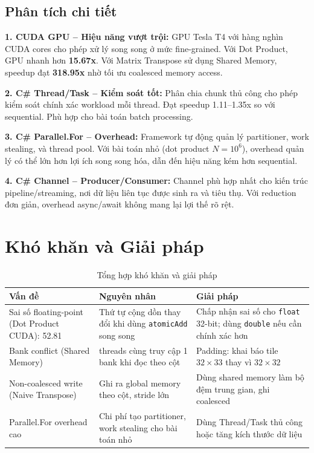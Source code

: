 \documentclass[12pt,a4paper]{article}
\begin{document}
\subsection{Phân tích chi tiết}

\textbf{1. CUDA GPU -- Hiệu năng vượt trội:}
GPU Tesla T4 với hàng nghìn CUDA cores cho phép xử lý song song ở mức fine-grained. Với Dot Product, GPU nhanh hơn \textbf{15.67x}. Với Matrix Transpose sử dụng Shared Memory, speedup đạt \textbf{318.95x} nhờ tối ưu coalesced memory access.

\textbf{2. C\# Thread/Task -- Kiểm soát tốt:}
Phân chia chunk thủ công cho phép kiểm soát chính xác workload mỗi thread. Đạt speedup 1.11--1.35x so với sequential. Phù hợp cho bài toán batch processing.

\textbf{3. C\# Parallel.For -- Overhead:}
Framework tự động quản lý partitioner, work stealing, và thread pool. Với bài toán nhỏ (dot product $N=10^6$), overhead quản lý có thể lớn hơn lợi ích song song hóa, dẫn đến hiệu năng kém hơn sequential.

\textbf{4. C\# Channel -- Producer/Consumer:}
Channel phù hợp nhất cho kiến trúc pipeline/streaming, nơi dữ liệu liên tục được sinh ra và tiêu thụ. Với reduction đơn giản, overhead async/await không mang lại lợi thế rõ rệt.

\section{Khó khăn và Giải pháp}

\begin{table}[H]
\centering
\caption{Tổng hợp khó khăn và giải pháp}
\begin{tabular}{>{\raggedright\arraybackslash}p{4.5cm}>{\raggedright\arraybackslash}p{4.5cm}>{\raggedright\arraybackslash}p{4.5cm}}
\toprule
\textbf{Vấn đề} & \textbf{Nguyên nhân} & \textbf{Giải pháp} \\
\midrule
Sai số floating-point (Dot Product CUDA): 52.81 &
Thứ tự cộng dồn thay đổi khi dùng \texttt{atomicAdd} song song &
Chấp nhận sai số cho \texttt{float} 32-bit; dùng \texttt{double} nếu cần chính xác hơn \\
\midrule
Bank conflict (Shared Memory) &
32 threads cùng truy cập 1 bank khi đọc theo cột &
Padding: khai báo tile $32 \times 33$ thay vì $32 \times 32$ \\
\midrule
Non-coalesced write (Naive Transpose) &
Ghi ra global memory theo cột, stride lớn &
Dùng shared memory làm bộ đệm trung gian, ghi coalesced \\
\midrule
Parallel.For overhead cao &
Chi phí tạo partitioner, work stealing cho bài toán nhỏ &
Dùng Thread/Task thủ công hoặc tăng kích thước dữ liệu \\
\bottomrule
\end{tabular}
\end{table}
\end{document}
